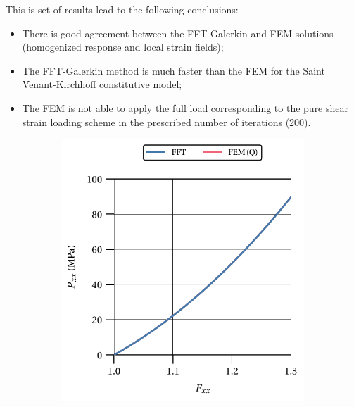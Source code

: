 This is set of results lead to the following conclusions:
\begin{itemize}
  \item There is good agreement between the FFT-Galerkin and FEM solutions (homogenized response and local strain fields);
  \item The FFT-Galerkin method is much faster than the FEM for the Saint Venant-Kirchhoff constitutive model;
  \item The FEM is not able to apply the full load corresponding to the pure shear strain loading scheme in the prescribed number of iterations (200).
\end{itemize}

\begin{figure}[hbt]
  \centering
	\begin{subfigure}[b]{0.49\textwidth}
    \centering
    \includegraphics[width=\textwidth]{figures/svk_2D_normal_material_response}
    \caption{}
    \label{subfig:svk_2D_normal_material_response}
  \end{subfigure}
  \begin{subfigure}[b]{0.49\textwidth}
    \centering

\end{subfigure}
\end{figure}
